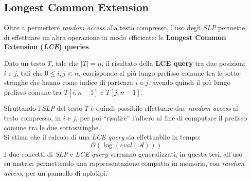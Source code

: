\subsection{Longest Common Extension}
Oltre a permettere \textit{random access} alla testo compresso, 
l'uso degli \textit{SLP} permette di effettuare 
un'altra operazione in modo efficiente: le \textbf{Longest Common Extension
  (\textit{LCE}) queries}.
\begin{definizione}
  Dato un testo $T$, tale che $|T|=n$, il risultato della \textbf{LCE query} tra
  due posizioni $i$ e $j$, tali che $0\leq i,j<n$, corrisponde al più lungo
  prefisso comune tra le sotto-stringhe che hanno come indice di partenza $i$ e
  $j$, avendo quindi il più lungo prefisso comune tra $T[i,n-1]$ e $T[j,n-1]$.
\end{definizione}
Sfruttando l'\textit{SLP} del testo $T$ è quindi possibile effettuare due
\textit{random access} al testo compresso, in $i$ e $j$, per poi ``risalire''
l'albero al fine di computare il prefisso comune tra le due sottostringhe.\\
Si stima che il calcolo di una \textit{LCE query} sia effettuabile in tempo:
\begin{equation}
  \label{eq:lcetime}
  \mathcal{O}\left(\log (eval(\mathcal{A}))\right)
\end{equation}
I due concetti di \textit{SLP} e \textit{LCE query} verranno generalizzati, in
questa tesi, all'uso su matrici permettendo una rappresentazione compatta in
memoria, con \textit{random access}, per un pannello di aplotipi.
